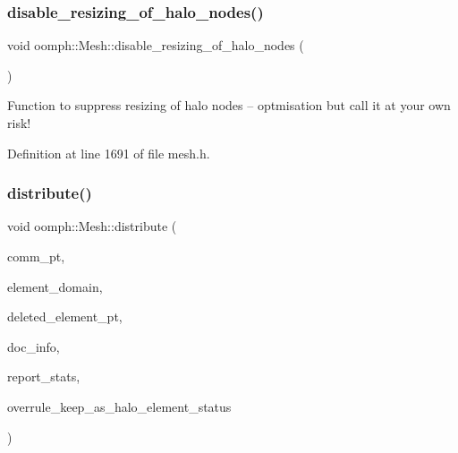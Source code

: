 \subsubsection{\texorpdfstring{disable\+\_\+resizing\+\_\+of\+\_\+halo\+\_\+nodes()}{disable\_resizing\_of\_halo\_nodes()}}
{\footnotesize\ttfamily void oomph\+::\+Mesh\+::disable\+\_\+resizing\+\_\+of\+\_\+halo\+\_\+nodes (\begin{DoxyParamCaption}{ }\end{DoxyParamCaption})\hspace{0.3cm}{\ttfamily [inline]}}



Function to suppress resizing of halo nodes -- optmisation but call it at your own risk! 



Definition at line 1691 of file mesh.\+h.

\mbox{\label{classoomph_1_1Mesh_ad8a0c5d583e4f7bc1f498b5ab27afd94}} 
\subsubsection{\texorpdfstring{distribute()}{distribute()}\hspace{0.1cm}{\footnotesize\ttfamily [1/2]}}
{\footnotesize\ttfamily void oomph\+::\+Mesh\+::distribute (\begin{DoxyParamCaption}\item[{\hyperlink{classoomph_1_1OomphCommunicator}{Oomph\+Communicator} $\ast$}]{comm\+\_\+pt,  }\item[{const \hyperlink{classoomph_1_1Vector}{Vector}$<$ unsigned $>$ \&}]{element\+\_\+domain,  }\item[{\hyperlink{classoomph_1_1Vector}{Vector}$<$ \hyperlink{classoomph_1_1GeneralisedElement}{Generalised\+Element} $\ast$$>$ \&}]{deleted\+\_\+element\+\_\+pt,  }\item[{\hyperlink{classoomph_1_1DocInfo}{Doc\+Info} \&}]{doc\+\_\+info,  }\item[{const bool \&}]{report\+\_\+stats,  }\item[{const bool \&}]{overrule\+\_\+keep\+\_\+as\+\_\+halo\+\_\+element\+\_\+status }\end{DoxyParamCaption})\hspace{0.3cm}{\ttfamily [virtual]}}



